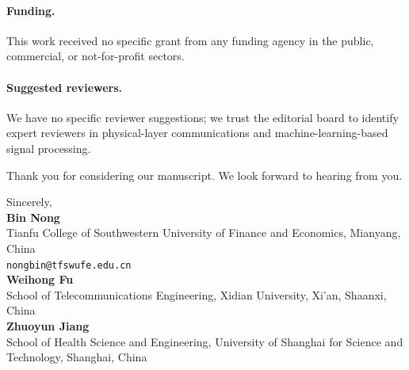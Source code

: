 \documentclass[11pt,a4paper]{article}
\begin{document}
\paragraph{Funding.}
This work received no specific grant from any funding agency in the public, commercial, or not-for-profit sectors.

\paragraph{Suggested reviewers.}
We have no specific reviewer suggestions; we trust the editorial board to identify expert reviewers in physical-layer communications and machine-learning-based signal processing.

\vspace{1em}

\noindent Thank you for considering our manuscript. We look forward to hearing from you.

\vspace{2em}

\noindent Sincerely,\\[1.4em]
\textbf{Bin Nong}\\
Tianfu College of Southwestern University of Finance and Economics, Mianyang, China\\
\texttt{nongbin@tfswufe.edu.cn}\\[0.6em]
\textbf{Weihong Fu}\\
School of Telecommunications Engineering, Xidian University, Xi'an, Shaanxi, China\\[0.6em]
\textbf{Zhuoyun Jiang}\\
School of Health Science and Engineering, University of Shanghai for Science and Technology, Shanghai, China
\end{document}
